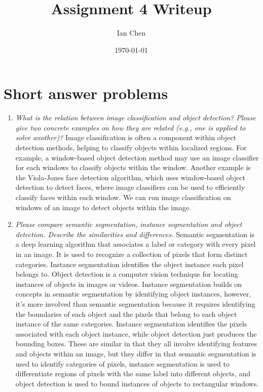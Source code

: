 \documentclass[11pt]{article}
\title{Assignment 4 Writeup}
\author{Ian Chen}
\date{\today}
\begin{document}
    \maketitle


    \section{Short answer problems}

    \begin{enumerate}
        \item \textit{What is the relation between image classification and object detection?
        Please give two concrete examples on how they are related (e.g., one is applied to solve another)?}\newline
        Image classification is often a component within object detection methods, helping to classify objects
        within localized regions. For example, a window-based object detection method may use an image classifier for
        each windows to classify objects within the window. Another example is the Viola-Jones face detection
        algorithm, which uses window-based object detection to detect faces, where image classifiers can be used to
        efficiently classify faces within each window. We can run image classification on windows of an image to
        detect objects within the image.

        \item \textit{Please compare semantic segmentation, instance segmentation and object detection.
        Describe the similarities and differences.}\newline
        Semantic segmentation is a deep learning algorithm that associates a label or category with every pixel in an
        image.
        It is used to recognize a collection of pixels that form distinct categories.
        Instance segmentation identifies the object instance each pixel belongs to.
        Object detection is a computer vision technique for locating instances of objects in images or videos.
        Instance segmentation builds on concepts in semantic segmentation by identifying object instances, however,
        it's more involved than semantic segmentation because it requires identifying the boundaries of each object
        and the pixels that belong to each object instance of the same categories.
        Instance segmentation identifies the pixels associated with each object instance, while object detection just
        produces the bounding boxes.
        These are similar in that they all involve identifying features and objects within an image, but they differ in
        that semantic segmentation is used to identify categories of pixels, instance segmentation is used to
        differentiate regions of pixels with the same label into different objects, and object detection is used to
        bound instances of objects to rectangular windows.


\end{enumerate}
\end{document}
